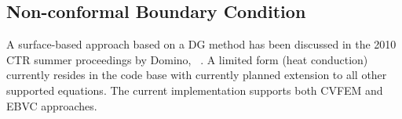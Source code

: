 \subsection{Non-conformal Boundary Condition}
A surface-based approach based on a DG method has been discussed in the 2010 CTR summer proceedings by Domino, ~\cite{Domino:2010}. 
A limited form (heat conduction) currently resides in the code base with currently planned extension to all other supported equations. 
The current implementation supports both CVFEM and EBVC approaches.

